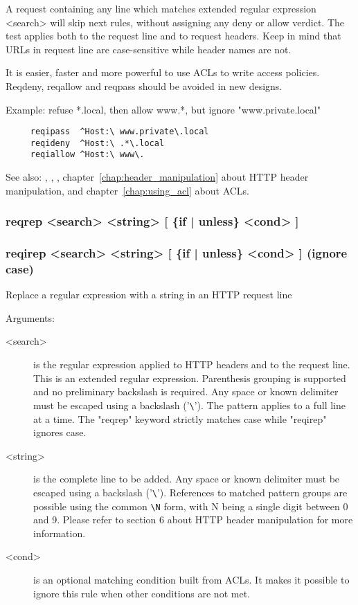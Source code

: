   A request containing any line which matches extended regular expression
  <search> will skip next rules, without assigning any deny or allow verdict.
  The test applies both to the request line and to request headers. Keep in
  mind that URLs in request line are case-sensitive while header names are not.

  It is easier, faster and more powerful to use ACLs to write access policies.
  Reqdeny, reqallow and reqpass should be avoided in new designs.

  Example: refuse *.local, then allow www.*, but ignore "www.private.local"
  \begin{verbatim}
     reqipass  ^Host:\ www.private\.local
     reqideny  ^Host:\ .*\.local
     reqiallow ^Host:\ www\.
  \end{verbatim}


See also: , , , chapter~\ref{chap:header_manipulation} about HTTP header
            manipulation, and chapter~\ref{chap:using_acl} about ACLs.

\subsubsection[reqrep]{reqrep <search> <string> [ \{if | unless\} <cond> ]}
\subsubsection[reqirep]{reqirep <search> <string> [ \{if | unless\} <cond> ] (ignore case)}


  Replace a regular expression with a string in an HTTP request line

 
  Arguments:
  \begin{description}
  \item[<search>] is the regular expression applied to HTTP headers and to the
              request line. This is an extended regular expression. Parenthesis
              grouping is supported and no preliminary backslash is required.
              Any space or known delimiter must be escaped using a backslash
              ('\verb|\|'). The pattern applies to a full line at a time. The "reqrep"
              keyword strictly matches case while "reqirep" ignores case.

  \item[<string>] is the complete line to be added. Any space or known delimiter
              must be escaped using a backslash ('\verb|\|'). References to matched
              pattern groups are possible using the common \verb|\N| form, with N
              being a single digit between 0 and 9. Please refer to section
              6 about HTTP header manipulation for more information.

  \item[<cond>] is an optional matching condition built from ACLs. It makes it
              possible to ignore this rule when other conditions are not met.
  \end{description}

